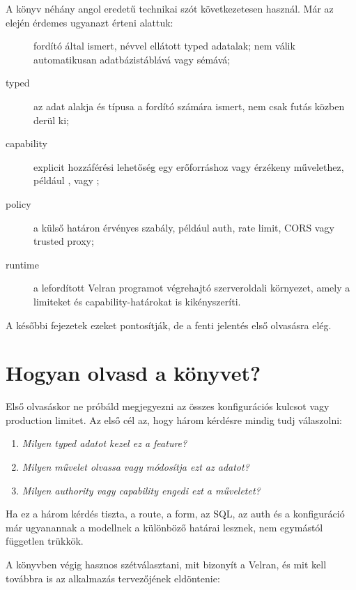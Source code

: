 A könyv néhány angol eredetű technikai szót következetesen használ. Már az elején érdemes ugyanazt érteni alattuk:

\begin{description}
  \item[] fordító által ismert, névvel ellátott typed adatalak; nem válik automatikusan adatbázistáblává vagy sémává;
  \item[typed] az adat alakja és típusa a fordító számára ismert, nem csak futás közben derül ki;
  \item[capability] explicit hozzáférési lehetőség egy erőforráshoz vagy érzékeny művelethez, például ,  vagy ;
  \item[policy] a külső határon érvényes szabály, például auth, rate limit, CORS vagy trusted proxy;
  \item[runtime] a lefordított Velran programot végrehajtó szerveroldali környezet, amely a limiteket és capability-határokat is kikényszeríti.
\end{description}

A későbbi fejezetek ezeket pontosítják, de a fenti jelentés első olvasásra elég.


\section*{Hogyan olvasd a könyvet?}

Első olvasáskor ne próbáld megjegyezni az összes konfigurációs kulcsot vagy production limitet. Az első cél az, hogy három kérdésre mindig tudj válaszolni:

\begin{enumerate}
  \item \emph{Milyen typed adatot kezel ez a feature?}
  \item \emph{Milyen művelet olvassa vagy módosítja ezt az adatot?}
  \item \emph{Milyen authority vagy capability engedi ezt a műveletet?}
\end{enumerate}

Ha ez a három kérdés tiszta, a route, a form, az SQL, az auth és a konfiguráció már ugyanannak a modellnek a különböző határai lesznek, nem egymástól független trükkök.

A könyvben végig hasznos szétválasztani, mit bizonyít a Velran, és mit kell továbbra is az alkalmazás tervezőjének eldöntenie:

